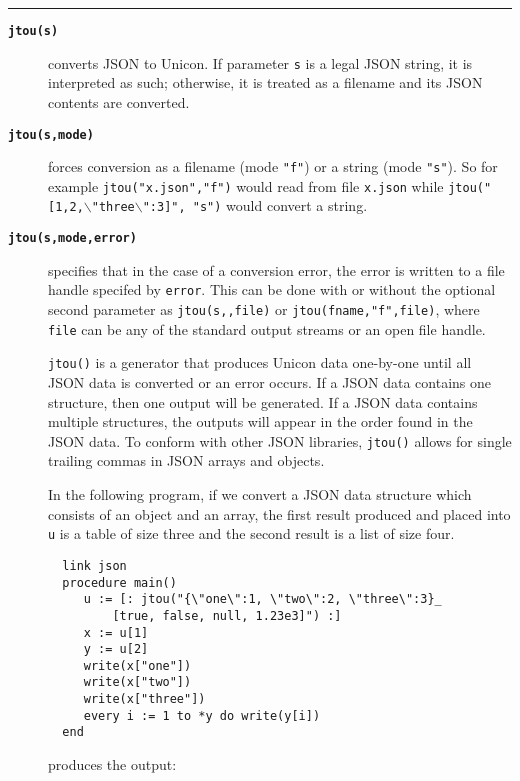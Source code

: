 \documentclass[letterpaper,12pt]{article}
\begin{document}
\noindent\rule{\textwidth}{1pt}

\begin{description}

\item[{\tt\bf jtou(s)}] converts JSON to Unicon.
  If parameter {\tt s} is a legal JSON string, it is interpreted as such;
  otherwise, it is treated as a filename and its JSON contents are converted.

\item[{\tt\bf jtou(s,mode)}] forces conversion as a filename (mode {\tt "f"})
  or a string (mode {\tt "s"}).
  So for example {\tt jtou("x.json","f")} would read from file {\tt x.json}
  while {\tt jtou("[1,2,{$\backslash$"three$\backslash$":3}]", "s")} would 
  convert a string.

\item[{\tt\bf jtou(s,mode,error)}] specifies that in the case of a conversion
  error, the error is written to a file handle specifed by {\tt error}.
  This can be done with or without the optional second parameter as 
  {\tt jtou(s,,file)} or {\tt jtou(fname,"f",file)}, where {\tt file}
  can be any of the standard output streams or an open file
  handle.

\vspace{1em}

{\tt jtou()} is a generator that produces Unicon data one-by-one until
all JSON data is converted or an error occurs. If a JSON data contains 
one structure,
then one output will be generated. If a JSON data contains multiple 
structures, the outputs will appear in the order found in the JSON data.
To conform with other JSON libraries, {\tt jtou()} allows for single
trailing commas in JSON arrays and objects.

In the following program, if we convert a JSON data structure which
consists of an object and an array, the first result produced and
placed into {\tt u} is a table of size three and the second result
is a list of size four.

  \begin{verbatim}
  link json
  procedure main()
     u := [: jtou("{\"one\":1, \"two\":2, \"three\":3}_
         [true, false, null, 1.23e3]") :]
     x := u[1]
     y := u[2]
     write(x["one"])
     write(x["two"])
     write(x["three"])
     every i := 1 to *y do write(y[i])
  end
  \end{verbatim}

produces the output:


\end{description}
\end{document}
